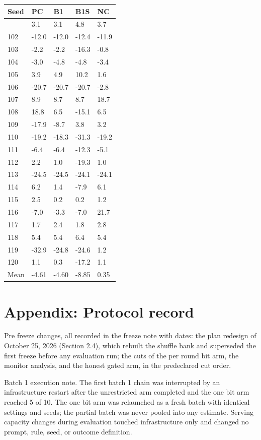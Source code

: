 \documentclass[11pt]{article}
\begin{document}
{\def\LTcaptype{none} %
\begin{longtable}[]{@{}lllll@{}}
\toprule\noalign{}
Seed & PC & B1 & B1S & NC \\
\midrule\noalign{}
\endhead
\bottomrule\noalign{}
\endlastfoot
101 & 3.1 & 3.1 & 4.8 & 3.7 \\
102 & -12.0 & -12.0 & -12.4 & -11.9 \\
103 & -2.2 & -2.2 & -16.3 & -0.8 \\
104 & -3.0 & -4.8 & -4.8 & -3.4 \\
105 & 3.9 & 4.9 & 10.2 & 1.6 \\
106 & -20.7 & -20.7 & -20.7 & -2.8 \\
107 & 8.9 & 8.7 & 8.7 & 18.7 \\
108 & 18.8 & 6.5 & -15.1 & 6.5 \\
109 & -17.9 & -8.7 & 3.8 & 3.2 \\
110 & -19.2 & -18.3 & -31.3 & -19.2 \\
111 & -6.4 & -6.4 & -12.3 & -5.1 \\
112 & 2.2 & 1.0 & -19.3 & 1.0 \\
113 & -24.5 & -24.5 & -24.1 & -24.1 \\
114 & 6.2 & 1.4 & -7.9 & 6.1 \\
115 & 2.5 & 0.2 & 0.2 & 1.2 \\
116 & -7.0 & -3.3 & -7.0 & 21.7 \\
117 & 1.7 & 2.4 & 1.8 & 2.8 \\
118 & 5.4 & 5.4 & 6.4 & 5.4 \\
119 & -32.9 & -24.8 & -24.6 & 1.2 \\
120 & 1.1 & 0.3 & -17.2 & 1.1 \\
Mean & -4.61 & -4.60 & -8.85 & 0.35 \\
\end{longtable}
}

\section*{Appendix: Protocol
record}\label{appendix-c.-protocol-record}

Pre freeze changes, all recorded in the freeze note with dates: the plan
redesign of October 25, 2026 (Section 2.4), which rebuilt the shuffle
bank and superseded the first freeze before any evaluation run; the cuts
of the per round bit arm, the monitor analysis, and the honest gated
arm, in the predeclared cut order.

Batch 1 execution note. The first batch 1 chain was interrupted by an
infrastructure restart after the unrestricted arm completed and the one
bit arm reached 5 of 10. The one bit arm was relaunched as a fresh batch
with identical settings and seeds; the partial batch was never pooled
into any estimate. Serving capacity changes during evaluation touched
infrastructure only and changed no prompt, rule, seed, or outcome
definition.
\end{document}
